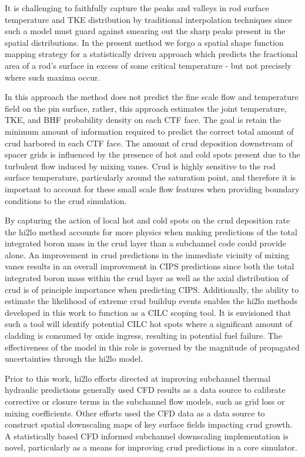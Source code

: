 It is challenging to faithfully capture the peaks and valleys in
rod surface temperature and TKE distribution by traditional interpolation
techniques since such a model must guard against smearing out the sharp peaks
present in the spatial distributions.
In the present method we forgo a spatial shape function mapping strategy
for a statistically driven approach which predicts the fractional
area of a rod's surface in excess of some critical temperature - but not
precisely where such maxima occur.

In this approach the method does not predict the fine scale flow and temperature field on the pin surface, rather, this approach estimates the joint temperature, TKE, and BHF probability density on each CTF face.  The goal is retain the minimum amount of information required to predict the correct total amount of crud harbored in each CTF face.  The amount of crud deposition downstream of spacer grids is influenced by the presence of hot and cold spots present due to the turbulent flow induced by mixing vanes.  Crud is highly sensitive to the rod surface temperature, particularly around the saturation point, and therefore it is important to account for these small scale flow features when providing boundary conditions to the crud simulation.

By capturing the action of local hot and cold spots on the crud deposition rate the hi2lo method accounts for more physics when making predictions of the total integrated boron mass in the crud layer than a subchannel code could provide alone.  An improvement in crud predictions in the immediate vicinity of mixing vanes results in an overall improvement in CIPS predictions since both the total integrated boron mass within the crud layer as well as the axial distribution of crud is of principle importance when predicting CIPS.  Additionally, the ability to estimate the likelihood of extreme crud buildup events enables the hi2lo methods developed in this work to function as a CILC scoping tool.  It is envisioned that such a tool will identify potential CILC hot spots where a significant amount of cladding is consumed by oxide ingress, resulting in potential fuel failure.  The effectiveness of the model in this role is governed by the magnitude of propagated uncertainties through the hi2lo model.

Prior to this work, hi2lo efforts directed at improving subchannel thermal hydraulic predictions generally used CFD results as a data source to calibrate corrective or closure terms in the subchannel flow models, such as grid loss or mixing coefficients.  Other efforts used the CFD data as a data source to construct spatial downscaling maps of key surface fields impacting crud growth.  A statistically based CFD informed subchannel downscaling implementation is novel, particularly as a means for improving crud predictions in a core simulator.

